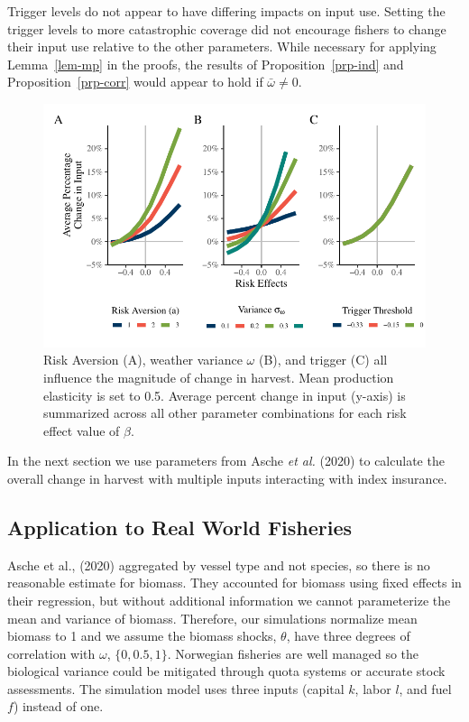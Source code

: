 \documentclass[
  letterpaper,
  DIV=11,
  numbers=noendperiod]{scrartcl}
\theoremstyle{plain}
\theoremstyle{plain}
\theoremstyle{remark}
\begin{document}
Trigger levels do not appear to have differing impacts on input use.
Setting the trigger levels to more catastrophic coverage did not
encourage fishers to change their input use relative to the other
parameters. While necessary for applying Lemma~\ref{lem-mp} in the
proofs, the results of Proposition~\ref{prp-ind} and
Proposition~\ref{prp-corr} would appear to hold if \(\bar\omega\ne0\).

\begin{figure}

{\centering \includegraphics{ibi-behavior_files/figure-pdf/fig-sum-1.pdf}

}

\caption{\label{fig-sum}Risk Aversion (A), weather variance \(\omega\)
(B), and trigger (C) all influence the magnitude of change in harvest.
Mean production elasticity is set to 0.5. Average percent change in
input (y-axis) is summarized across all other parameter combinations for
each risk effect value of \(\beta\).}

\end{figure}

In the next section we use parameters from Asche \emph{et al.} (2020) to
calculate the overall change in harvest with multiple inputs interacting
with index insurance.

\hypertarget{application-to-real-world-fisheries}{%
\subsection{Application to Real World
Fisheries}\label{application-to-real-world-fisheries}}

Asche et al., (2020) aggregated by vessel type and not species, so there
is no reasonable estimate for biomass. They accounted for biomass using
fixed effects in their regression, but without additional information we
cannot parameterize the mean and variance of biomass. Therefore, our
simulations normalize mean biomass to 1 and we assume the biomass
shocks, \(\theta\), have three degrees of correlation with \(\omega\),
\(\{0,0.5,1\}\). Norwegian fisheries are well managed so the biological
variance could be mitigated through quota systems or accurate stock
assessments. The simulation model uses three inputs (capital \(k\),
labor \(l\), and fuel \(f\)) instead of one.
\end{document}

